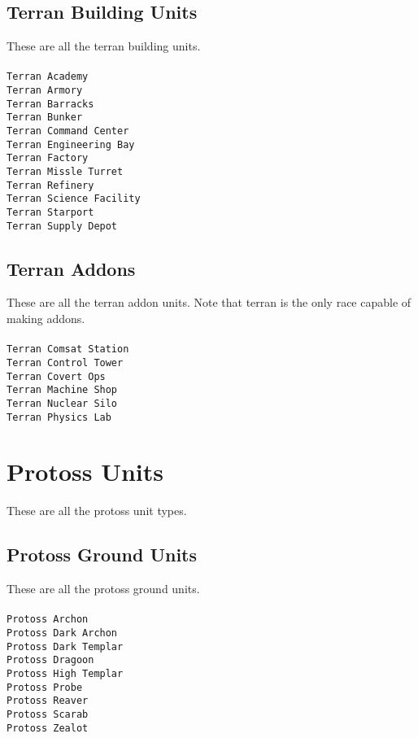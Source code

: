 \subsection{Terran Building Units}
These are all the terran building units.
\\\\
\verb|Terran Academy| \\
\verb|Terran Armory| \\
\verb|Terran Barracks| \\
\verb|Terran Bunker| \\
\verb|Terran Command Center| \\
\verb|Terran Engineering Bay| \\
\verb|Terran Factory| \\
\verb|Terran Missle Turret| \\
\verb|Terran Refinery| \\
\verb|Terran Science Facility| \\
\verb|Terran Starport| \\
\verb|Terran Supply Depot| \\

\subsection{Terran Addons}
These are all the terran addon units. Note that terran is the only race capable of making addons.
\\\\
\verb|Terran Comsat Station| \\
\verb|Terran Control Tower| \\
\verb|Terran Covert Ops| \\
\verb|Terran Machine Shop| \\
\verb|Terran Nuclear Silo| \\
\verb|Terran Physics Lab| \\

\section{Protoss Units}
These are all the protoss unit types.

\subsection{Protoss Ground Units}
These are all the protoss ground units.
\\\\
\verb|Protoss Archon| \\
\verb|Protoss Dark Archon| \\
\verb|Protoss Dark Templar| \\
\verb|Protoss Dragoon| \\
\verb|Protoss High Templar| \\
\verb|Protoss Probe| \\
\verb|Protoss Reaver| \\
\verb|Protoss Scarab| \\
\verb|Protoss Zealot| \\

